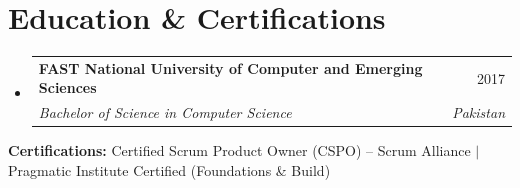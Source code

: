 \documentclass[letterpaper,10pt]{article}
\makeatletter
\newcommand{\resumeSubheading}[4]{
  \vspace{-2pt}\item
    \begin{tabular*}{0.97\textwidth}[t]{l@{\extracolsep{\fill}}r}
      \textbf{#1} & #2 \\
      \textit{\small#3} & \textit{\small #4} \\
    \end{tabular*}\vspace{-7pt}
}
\newcommand{\resumeSubHeadingListStart}{\begin{itemize}[leftmargin=0.15in, label={}]}
\newcommand{\resumeSubHeadingListEnd}{\end{itemize}}
\makeatother
\begin{document}
\section{Education \& Certifications}
  \resumeSubHeadingListStart
    \resumeSubheading
      {FAST National University of Computer and Emerging Sciences}{2017}
      {Bachelor of Science in Computer Science}{Pakistan}
  \resumeSubHeadingListEnd
  \vspace{-4pt}
  \begin{itemize}[leftmargin=0.15in, label={}]
    \small{\item{
     \textbf{Certifications:} Certified Scrum Product Owner (CSPO) -- Scrum Alliance $|$ Pragmatic Institute Certified (Foundations \& Build)
    }}
  \end{itemize}
\end{document}
